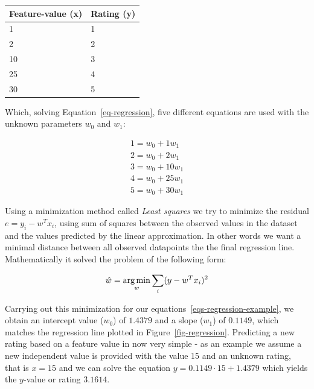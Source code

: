 \begin{table}[H]
  \centering
  \begin{tabular}{ll}
  \toprule
  Feature-value (x) & Rating (y) \\
  \midrule
   1 & 1 \\
   2  & 2 \\
   10  & 3 \\
   25 & 4 \\
   30  & 5 \\
   \bottomrule
  \end{tabular}
\end{table}

Which, solving Equation~\ref{eq-regression}, five different equations are
used with the unknown parameters $w_0$ and $w_1$:

\begin{equation}
  \label{eqs-regression-example}
  \begin{split}
    1 = w_0 + 1 w_1 \\
    2 = w_0 + 2 w_1 \\
    3 = w_0 + 10 w_1 \\
    4 = w_0 + 25 w_1 \\
    5 = w_0 + 30 w_1
  \end{split}
\end{equation}

Using a minimization method called \textit{Least squares} we try to minimize
the residual $e = y_i - w^{T}x_{i}$, using sum of squares between the observed
values in the dataset and the values predicted by the linear approximation. In
other words we want a minimal distance between all observed datapoints the the
final regression line. Mathematically it solved the problem of the following
form:

\begin{equation}
  \label{least-squares}
  \hat{w} = \operatorname*{arg\,min}_w \sum_{i} (y - w^{T}x_{i})^2
\end{equation}

Carrying out this minimization for our equations~\ref{eqs-regression-example},
we obtain an intercept value ($w_0$) of $1.4379$ and a slope ($w_1$) of
$0.1149$, which matches the regression line plotted in
Figure~\ref{fig-regression}. Predicting a new rating based on a feature value
in now very simple - as an example we assume a new independent value is
provided with the value 15 and an unknown rating, that is $x=15$ and we can
solve the equation $y = 0.1149 \cdot 15 + 1.4379$ which yields the $y$-value or
rating $3.1614$.

